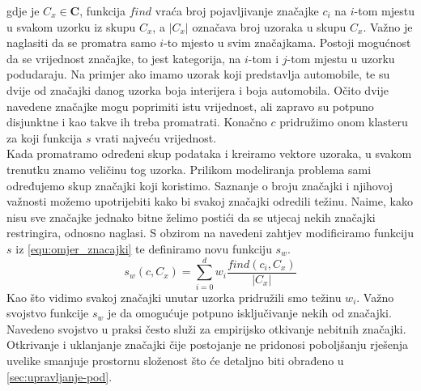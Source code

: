 \documentclass[a4paper,twoside,12pt]{memoir} %
\begin{document}
gdje je $C_x \in \mathbf{C}$, funkcija $find$ vraća broj pojavljivanje značajke $c_i$ na $i$-tom mjestu u svakom uzorku iz skupu $C_x$, a $|C_x|$ označava broj uzoraka u skupu $C_x$. Važno je naglasiti da se promatra samo $i$-to mjesto u svim značajkama. Postoji mogućnost da se vrijednost značajke, to jest kategorija, na $i$-tom i $j$-tom mjestu u uzorku podudaraju. Na primjer ako imamo uzorak koji predstavlja automobile, te su dvije od značajki danog uzorka boja interijera i boja automobila. Očito dvije navedene značajke mogu poprimiti istu vrijednost, ali zapravo su potpuno disjunktne i kao takve ih treba promatrati. Konačno $c$ pridružimo onom klasteru za koji funkcija $s$ vrati najveću vrijednost.\\ Kada promatramo određeni skup podataka i kreiramo vektore uzoraka, u svakom trenutku znamo veličinu tog uzorka. Prilikom modeliranja problema sami određujemo skup značajki koji koristimo. Saznanje o broju značajki i njihovoj važnosti možemo upotrijebiti kako bi svakoj značajki odredili težinu. Naime, kako nisu sve značajke jednako bitne želimo postići da se utjecaj nekih značajki restringira, odnosno naglasi.
S obzirom na navedeni zahtjev modificiramo funkciju $s$ iz \ref{equ:omjer_znacajki} te definiramo novu funkciju $s_w$.
\begin{equation}
\label{equ:omjer_znac_tezine}
s_w(c,C_x) = \sum_{i=0}^{d}w_i\frac{find(c_i,C_x)}{|C_x|}
\end{equation}
Kao što vidimo svakoj značajki unutar uzorka pridružili smo težinu $w_i$. Važno svojstvo funkcije $s_w$ je da omogućuje potpuno isključivanje nekih od značajki. Navedeno svojstvo u praksi često služi za empirijsko otkivanje nebitnih značajki. Otkrivanje i uklanjanje značajki čije postojanje ne pridonosi poboljšanju rješenja uvelike smanjuje prostornu složenost što će detaljno biti obrađeno u \ref{sec:upravljanje-pod}.
\end{document}
